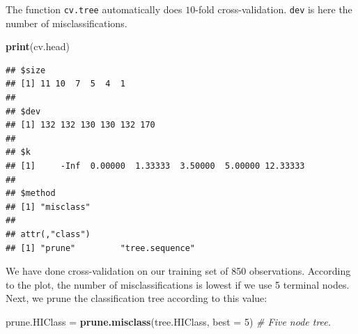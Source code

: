 \documentclass[ignorenonframetext,]{beamer}
\newenvironment{Shaded}{\begin{snugshade}}{\end{snugshade}}
\newcommand{\KeywordTok}[1]{\textcolor[rgb]{0.13,0.29,0.53}{\textbf{#1}}}
\newcommand{\DataTypeTok}[1]{\textcolor[rgb]{0.13,0.29,0.53}{#1}}
\newcommand{\DecValTok}[1]{\textcolor[rgb]{0.00,0.00,0.81}{#1}}
\newcommand{\StringTok}[1]{\textcolor[rgb]{0.31,0.60,0.02}{#1}}
\newcommand{\CommentTok}[1]{\textcolor[rgb]{0.56,0.35,0.01}{\textit{#1}}}
\newcommand{\NormalTok}[1]{#1}
\begin{document}
\begin{frame}[fragile]

The function \texttt{cv.tree} automatically does \(10\)-fold
cross-validation. \texttt{dev} is here the number of misclassifications.

\begin{Shaded}
\begin{Highlighting}[]
\KeywordTok{print}\NormalTok{(cv.head)}
\end{Highlighting}
\end{Shaded}

\begin{verbatim}
## $size
## [1] 11 10  7  5  4  1
## 
## $dev
## [1] 132 132 130 130 132 170
## 
## $k
## [1]     -Inf  0.00000  1.33333  3.50000  5.00000 12.33333
## 
## $method
## [1] "misclass"
## 
## attr(,"class")
## [1] "prune"         "tree.sequence"
\end{verbatim}

\end{frame}

\begin{frame}[fragile]

We have done cross-validation on our training set of 850 observations.
According to the plot, the number of misclassifications is lowest if we
use 5 terminal nodes. Next, we prune the classification tree according
to this value:

\begin{Shaded}
\begin{Highlighting}[]
\NormalTok{prune.HIClass =}\StringTok{ }\KeywordTok{prune.misclass}\NormalTok{(tree.HIClass, }\DataTypeTok{best =} \DecValTok{5}\NormalTok{)}
\CommentTok{# Five node tree.}
\end{Highlighting}
\end{Shaded}

\end{frame}
\end{document}
